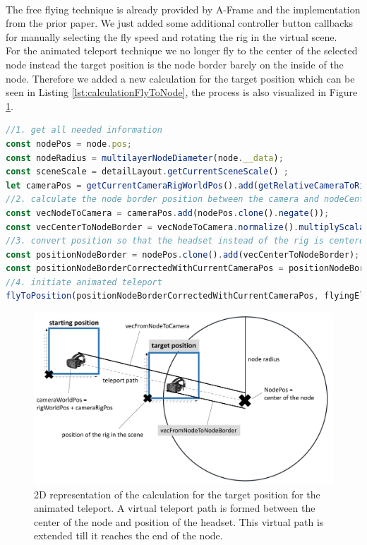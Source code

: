 \\
The free flying technique is already provided by A-Frame and the implementation from the prior paper.
We just added some additional controller button callbacks for manually selecting the fly speed and rotating the rig in the virtual scene.\\
For the animated teleport technique we no longer fly to the center of the selected node instead the target position is the node border barely on the inside of the node. Therefore we added a new calculation for the target position which can be seen in Listing \ref{lst:calculationFlyToNode}, the process is also visualized in Figure \ref{fig:vrFlyToNode}.

\begin{lstlisting}[language=JavaScript,label={lst:calculationFlyToNode},caption=Matrix calculations for determining the target position of the animated teleport.]
//1. get all needed information
const nodePos = node.pos;
const nodeRadius = multilayerNodeDiameter(node.__data);
const sceneScale = detailLayout.getCurrentSceneScale() ;
let cameraPos = getCurrentCameraRigWorldPos().add(getRelativeCameraToRigPos());
//2. calculate the node border position between the camera and nodeCenter
const vecNodeToCamera = cameraPos.add(nodePos.clone().negate());
const vecCenterToNodeBorder = vecNodeToCamera.normalize().multiplyScalar(nodeRadius*0.95*sceneScale);//*0.95 as we want to be slightly inside the selected node
//3. convert position so that the headset instead of the rig is centered
const positionNodeBorder = nodePos.clone().add(vecCenterToNodeBorder);
const positionNodeBorderCorrectedWithCurrentCameraPos = positionNodeBorder.clone().add(getRelativeCameraToRigPos().negate());
//4. initiate animated teleport
flyToPosition(positionNodeBorderCorrectedWithCurrentCameraPos, flyingElement);
\end{lstlisting}
\begin{figure}[h]
    \centering
    \includegraphics[width=1\textwidth]{graphics/flyToNodePositionCalc.jpg}
    \caption{2D representation of the calculation for the target position for the animated teleport. A virtual teleport path is formed between the center of the node and position of the headset. This virtual path is extended till it reaches the end of the node.} 
    \label{fig:vrFlyToNode} 
\end{figure}

